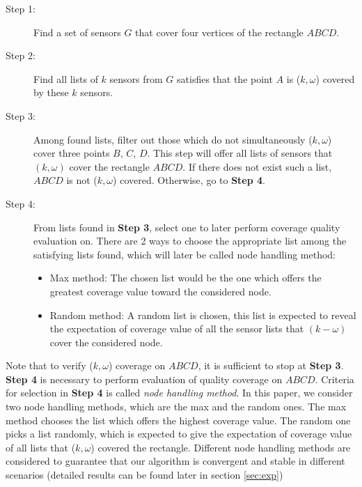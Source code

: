 \begin{description}
	\item[Step 1:] Find a set of sensors $G$ that cover four vertices of the rectangle $ ABCD $.
	\item[Step 2:] Find all lists of $k$ sensors from $G$ satisfies that the point $A$ is ($k,\omega$) covered by these $k$ sensors.
	\item[Step 3:] Among found lists, filter out those which do not simultaneously ($k,\omega$) cover three points $B$, $C$, $D$. This step will offer all lists of sensors that $(k,\omega)$ cover the rectangle $ABCD$. If there does not exist such a list, $ABCD$ is not ($k,\omega$) covered. Otherwise, go to {\bfseries Step 4}.
	\item[Step 4:] From lists found in {\bfseries Step 3}, select one to later perform coverage quality evaluation on. There are 2 ways to choose the appropriate list among the satisfying lists found, which will later be called node handling method:
	\begin{itemize}
		\item Max method: The chosen list would be the one which offers the greatest coverage value toward the considered node.
		\item Random method: A random list is chosen, this list is expected to reveal the expectation of coverage value of all the sensor lists that $(k-\omega)$ cover the considered node.
	\end{itemize}
\end{description}
\par Note that to verify ($k,\omega$) coverage on $ABCD$, it is sufficient to stop at {\bfseries Step 3}. {\bfseries Step 4} is necessary to perform evaluation of quality coverage on $ABCD$. Criteria for selection in {\bfseries Step 4} is called {\itshape node handling method}. In this paper, we consider two node handling methods, which are the max and the random ones. The max method chooses the list which offers the highest coverage value. The random one picks a list randomly, which is expected to give the expectation of coverage value of all lists that ($k,\omega$) covered the rectangle. Different node handling methods are considered to guarantee that our algorithm is convergent and stable in different scenarios (detailed results can be found later in section \ref{sec:exp})\par
